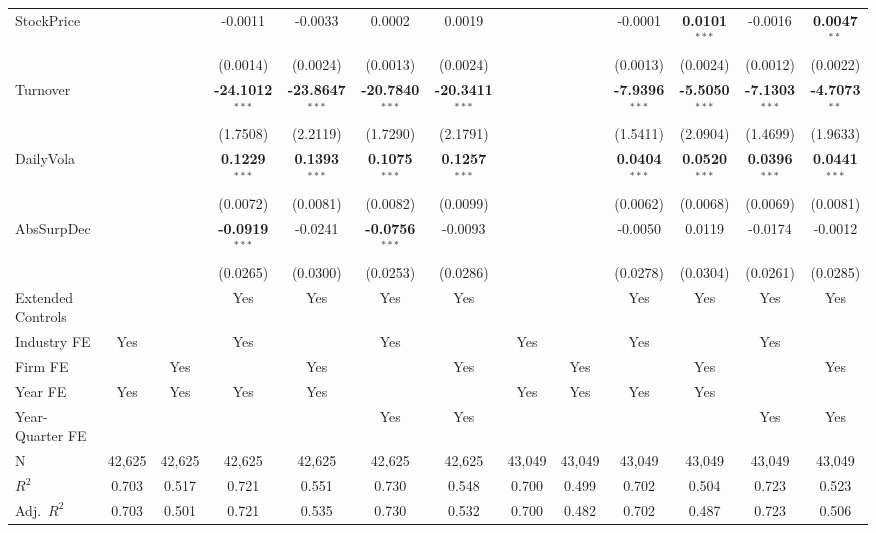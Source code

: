 \documentclass[11pt,a4paper]{article}
\begin{document}
\begin{table}[htbp]
\begin{tabular}{lcccccccccccc}
StockPrice &  &  & -0.0011 & -0.0033 & 0.0002 & 0.0019 &  &  & -0.0001 & \textbf{0.0101}$^{***}$ & -0.0016 & \textbf{0.0047}$^{**}$ \\
 &  &  & (0.0014) & (0.0024) & (0.0013) & (0.0024) &  &  & (0.0013) & (0.0024) & (0.0012) & (0.0022) \\
Turnover &  &  & \textbf{-24.1012}$^{***}$ & \textbf{-23.8647}$^{***}$ & \textbf{-20.7840}$^{***}$ & \textbf{-20.3411}$^{***}$ &  &  & \textbf{-7.9396}$^{***}$ & \textbf{-5.5050}$^{***}$ & \textbf{-7.1303}$^{***}$ & \textbf{-4.7073}$^{**}$ \\
 &  &  & (1.7508) & (2.2119) & (1.7290) & (2.1791) &  &  & (1.5411) & (2.0904) & (1.4699) & (1.9633) \\
DailyVola &  &  & \textbf{0.1229}$^{***}$ & \textbf{0.1393}$^{***}$ & \textbf{0.1075}$^{***}$ & \textbf{0.1257}$^{***}$ &  &  & \textbf{0.0404}$^{***}$ & \textbf{0.0520}$^{***}$ & \textbf{0.0396}$^{***}$ & \textbf{0.0441}$^{***}$ \\
 &  &  & (0.0072) & (0.0081) & (0.0082) & (0.0099) &  &  & (0.0062) & (0.0068) & (0.0069) & (0.0081) \\
AbsSurpDec &  &  & \textbf{-0.0919}$^{***}$ & -0.0241 & \textbf{-0.0756}$^{***}$ & -0.0093 &  &  & -0.0050 & 0.0119 & -0.0174 & -0.0012 \\
 &  &  & (0.0265) & (0.0300) & (0.0253) & (0.0286) &  &  & (0.0278) & (0.0304) & (0.0261) & (0.0285) \\
\midrule
Extended Controls &  &  & Yes & Yes & Yes & Yes &  &  & Yes & Yes & Yes & Yes \\
Industry FE & Yes &  & Yes &  & Yes &  & Yes &  & Yes &  & Yes &  \\
Firm FE &  & Yes &  & Yes &  & Yes &  & Yes &  & Yes &  & Yes \\
Year FE & Yes & Yes & Yes & Yes &  &  & Yes & Yes & Yes & Yes &  &  \\
Year-Quarter FE &  &  &  &  & Yes & Yes &  &  &  &  & Yes & Yes \\
\midrule
N & 42,625 & 42,625 & 42,625 & 42,625 & 42,625 & 42,625 & 43,049 & 43,049 & 43,049 & 43,049 & 43,049 & 43,049 \\
$R^2$ & 0.703 & 0.517 & 0.721 & 0.551 & 0.730 & 0.548 & 0.700 & 0.499 & 0.702 & 0.504 & 0.723 & 0.523 \\
Adj.~$R^2$ & 0.703 & 0.501 & 0.721 & 0.535 & 0.730 & 0.532 & 0.700 & 0.482 & 0.702 & 0.487 & 0.723 & 0.506 \\
\bottomrule
\end{tabular}
\begin{minipage}{\linewidth}

\end{minipage}
\end{table}
\end{document}
